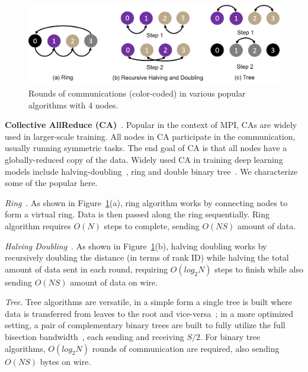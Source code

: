 \begin{figure}[t!]
	\centering
	\includegraphics[width=.6\linewidth]{Figures/collectivesAlgorithms.png}
	\caption{Rounds of communications (color-coded) in various popular \collectives algorithms with 4 nodes.}
	\label{fig:collectivesAlgorithm}
\end{figure}

\noindent\textbf{Collective AllReduce (CA)}~\cite{Sack:2011:SCM:2522220,Thakur:2005:OCC:2747766.2747771,collectivesOptimization,blum2000architectures,bala1995ccl}. Popular in the context of MPI, CAs are widely used in larger-scale training. All nodes in CA participate in the communication, usually running symmetric tasks. The end goal of CA is that all nodes have a globally-reduced copy of the data. Widely used CA in training deep learning models include halving-doubling~\cite{ImageNetIn1Hour}, ring and double binary tree~\cite{Operatio73:online, Sergeev2018HorovodFA}. We characterize some of the popular \cmpi here.

\noindent\textit{Ring}~\cite{patarasuk2009bandwidth}. As shown in Figure~\ref{fig:collectivesAlgorithm}(a), ring algorithm works by connecting nodes to form a virtual ring. Data is then passed along the ring sequentially. Ring algorithm requires $O(N)$ steps to complete, sending $O(NS)$ amount of data.

\noindent\textit{Halving Doubling}~\cite{Thakur:2005:OCC:2747766.2747771}. As shown in Figure~\ref{fig:collectivesAlgorithm}(b), halving doubling works by recursively doubling the distance (in terms of rank ID) while halving the total amount of data sent in each round, requiring $O(log_{2}{N})$ steps to finish while also sending $O(NS)$ amount of data on wire.

\noindent\textit{Tree}. Tree algorithms are versatile, in a simple form a single tree is built where data is transferred from leaves to the root and vice-versa~\cite{firecaffe}; in a more optimized setting, a pair of complementary binary trees are built to fully utilize the full bisection bandwidth~\cite{dbt}, each sending and receiving $S/2$. For binary tree \collectives algorithms, $O(log_2N)$ rounds of communication are required, also sending $O(NS)$ bytes on wire. 

